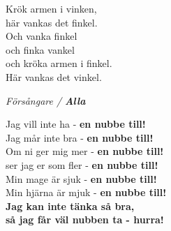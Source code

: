 \documentclass[a6paper, 10pt, twoside]{article}
\begin{document}
\newpage
\noindent
\begin{center}
\end{center}
\begin{lyrics}
Krök armen i vinken, \\
här vankas det finkel. \\
Och vanka finkel \\
och finka vankel \\
och kröka armen i finkel. \\
Här vankas det vinkel. 
\end{lyrics}
\begin{center}
    \vspace{40pt}
    \textit{Försångare / \textbf{Alla}}
\end{center}
\begin{lyrics}
Jag vill inte ha - \textbf{en nubbe till!}\\
Jag mår inte bra - \textbf{en nubbe till!}\\
Om ni ger mig mer - \textbf{en nubbe till!}\\
ser jag er som fler - \textbf{en nubbe till!}\\
\vspace{5pt}
Min mage är sjuk - \textbf{en nubbe till!}\\
Min hjärna är mjuk - \textbf{en nubbe till!}\\
\textbf{Jag kan inte tänka så bra,\\
så jag får väl nubben ta - hurra!}\\
\end{lyrics}
\end{document}
